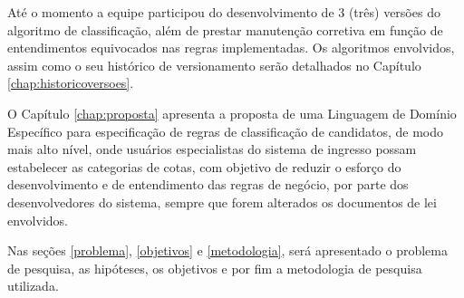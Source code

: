 Até o momento a equipe participou do desenvolvimento de 3 (três) versões do algoritmo de classificação, além de prestar manutenção corretiva em função de entendimentos equivocados nas regras implementadas.  Os algoritmos envolvidos, assim como o seu histórico de versionamento serão detalhados no Capítulo \ref{chap:historicoversoes}.

O Capítulo \ref{chap:proposta} apresenta a proposta de uma Linguagem de Domínio Específico para especificação de regras de classificação de candidatos, de modo mais alto nível, onde usuários especialistas do sistema de ingresso possam estabelecer as categorias de cotas, com objetivo de reduzir o esforço do desenvolvimento e de entendimento das regras de negócio, por parte dos desenvolvedores do sistema, sempre que forem alterados os documentos de lei envolvidos.

Nas seções \ref{problema}, \ref{objetivos}  e \ref{metodologia}, será apresentado o problema de pesquisa, as hipóteses, os objetivos e por fim a metodologia de pesquisa utilizada.
